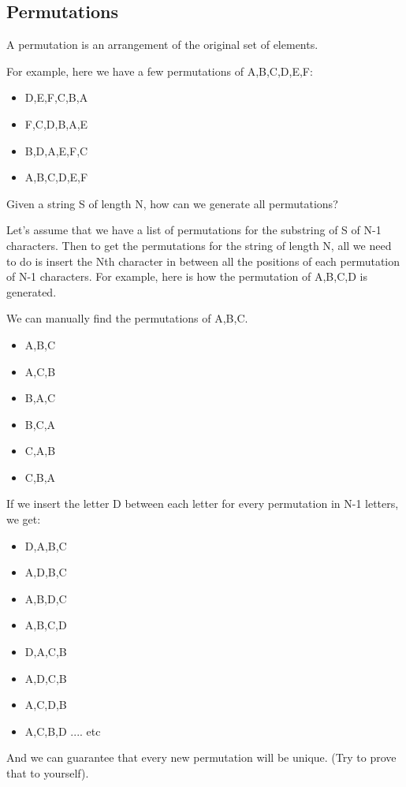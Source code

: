 \documentclass[11pt,oneside]{book}
\begin{document}
\subsection{Permutations}

A permutation is an arrangement of the original set of elements.

For example, here we have a few permutations of A,B,C,D,E,F:

\begin{itemize}
\item D,E,F,C,B,A
\item F,C,D,B,A,E
\item B,D,A,E,F,C
\item A,B,C,D,E,F
\end{itemize}

Given a string S of length N, how can we generate all permutations?

Let's assume that we have a list of permutations for the substring of S of N-1 characters. Then to get the permutations for the string of length N, all we need to do is insert the Nth character in between all the positions of each permutation of N-1 characters. For example, here is how the permutation of A,B,C,D is generated.

We can manually find the permutations of A,B,C.

\begin{itemize}
\item A,B,C
\item A,C,B
\item B,A,C
\item B,C,A
\item C,A,B
\item C,B,A
\end{itemize}

If we insert the letter D between each letter for every permutation in N-1 letters, we get:

\begin{itemize}
\item D,A,B,C
\item A,D,B,C
\item A,B,D,C
\item A,B,C,D
\item D,A,C,B
\item A,D,C,B
\item A,C,D,B
\item A,C,B,D
.... etc
\end{itemize}

And we can guarantee that every new permutation will be unique. (Try to prove that to yourself).
\end{document}
